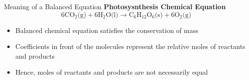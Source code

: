 \documentclass[11pt]{beamer}
\begin{document}
\begin{frame}{Meaning of a Balanced Equation}
  \textbf{Photosysnthesis Chemical Equation}
  \begin{equation}
    6\text{CO$_2$(g)} + 6\text{H$_2$O(l)} \rightarrow \text{C$_6$H$_{12}$O$_6$(s)}
    + 6\text{O$_2$(g)}
  \end{equation}
  
  \begin{itemize}
  \item Balanced chemical equation satisfies the conservation of mass
  \item Coefficients in front of the molecules represent the relative
    moles of reactants and products
  \item Hence, moles of reactants and products are not necessarily
    equal
  \end{itemize}
\end{frame}
\end{document}
